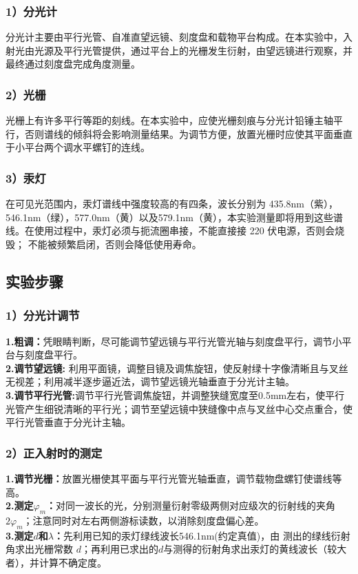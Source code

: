 \documentclass{ctexart}
\begin{document}
\subsubsection*{1）分光计}
分光计主要由平行光管、自准直望远镜、刻度盘和载物平台构成。在本实验中，入射光由光源及平行光管提供，通过平台上的光栅发生衍射，由望远镜进行观察，并最终通过刻度盘完成角度测量。
\subsubsection*{2）光栅}
光栅上有许多平行等距的刻线。在本实验中，应使光栅刻痕与分光计铅锤主轴平行，否则谱线的倾斜将会影响测量结果。为调节方便，放置光栅时应使其平面垂直于小平台两个调水平螺钉的连线。
\subsubsection*{3）汞灯}
在可见光范围内，汞灯谱线中强度较高的有四条，波长分别为 435.8nm（紫），546.1nm（绿），577.0nm（黄）以及579.1nm（黄），本实验测量即将用到这些谱线。在使用过程中，汞灯必须与扼流圈串接，不能直接接 220 伏电源，否则会烧毁；
不能被频繁启闭，否则会降低使用寿命。
\subsection{实验步骤}
\subsubsection*{1）分光计调节}
\noindent \textbf{1.粗调：}凭眼睛判断，尽可能调节望远镜与平行光管光轴与刻度盘平行，调节小平台与刻度盘平行。\\
\noindent \textbf{2.调节望远镜:} 利用平面镜，调整目镜及调焦旋钮，使反射绿十字像清晰且与叉丝无视差；利用减半逐步逼近法，调节望远镜光轴垂直于分光计主轴。\\
\noindent \textbf{3.调节平行光管:}调节平行光管调焦旋钮，并调整狭缝宽度至0.5mm左右，使平行光管产生细锐清晰的平行光；调节至望远镜中狭缝像中点与叉丝中心交点重合，使平行光管垂直于分光计主轴。
\subsubsection*{2）正入射时的测定}
\noindent \textbf{1.调节光栅：}放置光栅使其平面与平行光管光轴垂直，调节载物盘螺钉使谱线等高。\\
\noindent \textbf{2.测定$\varphi_m$：}对同一波长的光，分别测量衍射零级两侧对应级次的衍射线的夹角$2\varphi_m$；注意同时对左右两侧游标读数，以消除刻度盘偏心差。\\
\noindent \textbf{3.测定$d$和$\lambda$：}先利用已知的汞灯绿线波长546.1nm(约定真值)，由
测出的绿线衍射角求出光栅常数 $d$；再利用已求出的$d$与测得的衍射角求出汞灯的黄线波长（较大者），并计算不确定度。
\end{document}
